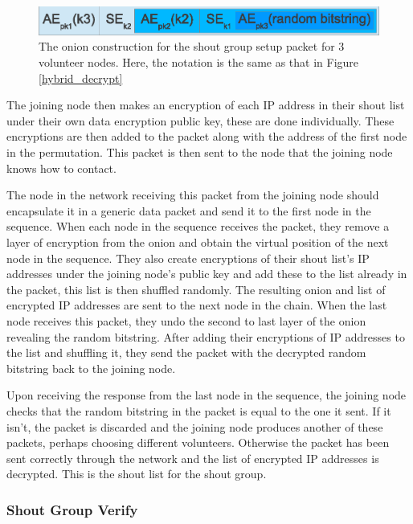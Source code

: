 \documentclass[ %
                    author={Luke Murray},
                supervisor={Dr. Simon Hollis},
                     title={Shadow Peer-to-Peer Networks},
                  subtitle={},
                    degree={MEng},
                      year={2013} ]{thesis}
\begin{document}
\begin{figure}[h]
    \centering
    \includegraphics{diagrams/shout_group_onion.eps}
    \caption{The onion construction for the shout group setup packet for 3 volunteer nodes. Here, the notation is the same as that in Figure \ref{hybrid_decrypt}}
    \label{setup_enc}
\end{figure}

The joining node then makes an encryption of each IP address in their shout list under their own data encryption public key, these are done individually. These encryptions are then added to the packet along with the address of the first node in the permutation. This packet is then sent to the node that the joining node knows how to contact.

The node in the network receiving this packet from the joining node should encapsulate it in a generic data packet and send it to the first node in the sequence. When each node in the sequence receives the packet, they remove a layer of encryption from the onion and obtain the virtual position of the next node in the sequence. They also create encryptions of their shout list's IP addresses under the joining node's public key and add these to the list already in the packet, this list is then shuffled randomly. The resulting onion and list of encrypted IP addresses are sent to the next node in the chain. When the last node receives this packet, they undo the second to last layer of the onion revealing the random bitstring. After adding their encryptions of IP addresses to the list and shuffling it, they send the packet with the decrypted random bitstring back to the joining node.

Upon receiving the response from the last node in the sequence, the joining node checks that the random bitstring in the packet is equal to the one it sent. If it isn't, the packet is discarded and the joining node produces another of these packets, perhaps choosing different volunteers. Otherwise the packet has been sent correctly through the network and the list of encrypted IP addresses is decrypted. This is the shout list for the shout group.

\subsubsection{Shout Group Verify}
\end{document}
